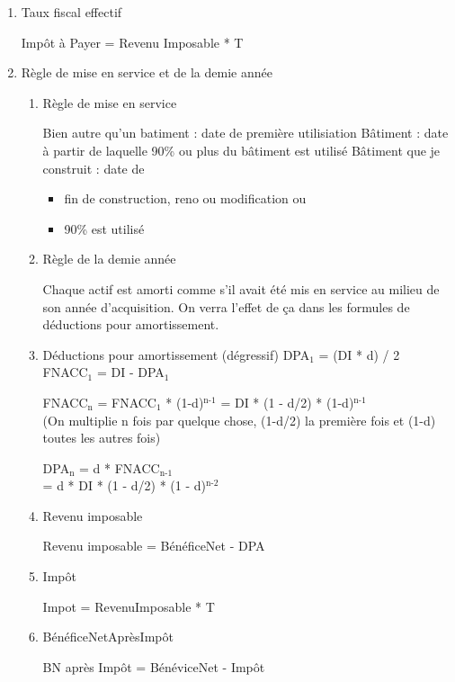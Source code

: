 \documentclass[11pt]{article}
\begin{document}
\begin{enumerate}
\item Taux fiscal effectif
\label{sec:org72e107b}

Impôt à Payer = Revenu Imposable * T

\item Règle de mise en service et de la demie année
\label{sec:org31aeece}

\begin{enumerate}
\item Règle de mise en service
\label{sec:org1dff2ee}

Bien autre qu'un batiment : date de première utilisiation
Bâtiment : date à partir de laquelle 90\% ou plus du bâtiment est utilisé
Bâtiment que je construit : date de 
\begin{itemize}
\item fin de construction, reno ou modification ou
\item 90\% est utilisé
\end{itemize}

\item Règle de la demie année
\label{sec:orgcbc7825}

Chaque actif est amorti comme s'il avait été mis en service au milieu de son
année d'acquisition.  On verra l'effet de ça dans les formules de déductions
pour amortissement.

\item Déductions pour amortissement (dégressif)
\label{sec:org048d1a4}
DPA\(_{\text{1}}\) = (DI * d) / 2 \\
FNACC\(_{\text{1}}\) = DI - DPA\(_{\text{1}}\)

FNACC\(_{\text{n}}\) = FNACC\(_{\text{1}}\) * (1-d)\(^{\text{n-1}}\) = DI * (1 - d/2) * (1-d)\(^{\text{n-1}}\) \\
(On multiplie n fois par quelque chose, (1-d/2) la première fois et (1-d) toutes
les autres fois)

DPA\(_{\text{n}}\) = d * FNACC\(_{\text{n-1 }}\)\\
= d * DI * (1 - d/2) * (1 - d)\(^{\text{n-2}}\)

\item Revenu imposable
\label{sec:org9dde0d5}

Revenu imposable = BénéficeNet - DPA

\item Impôt
\label{sec:org256c164}

Impot = RevenuImposable * T

\item BénéficeNetAprèsImpôt
\label{sec:org839ac67}

BN après Impôt = BénéviceNet - Impôt
\end{enumerate}
\end{enumerate}
\end{document}
